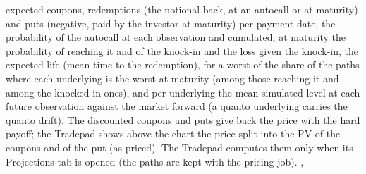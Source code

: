 expected coupons, redemptions (the notional back, at an autocall or at maturity) and puts (negative, paid by the
investor at maturity) per payment date, the
probability of the autocall at each observation and cumulated, at maturity the probability of reaching it and of the
knock-in and the loss given the knock-in, the expected life (mean time to the redemption), for a worst-of the share
of the paths where each underlying is the worst at maturity (among those reaching it and among the knocked-in ones),
and per underlying the mean simulated level at each future observation
against the market forward (a quanto underlying carries the quanto drift). The discounted coupons and puts give back the
price with the hard payoff; the Tradepad shows above the chart the price split into the PV of the coupons and of the
put (as priced). The Tradepad computes them only when its Projections tab is opened (the paths are
kept with the pricing job). ,
